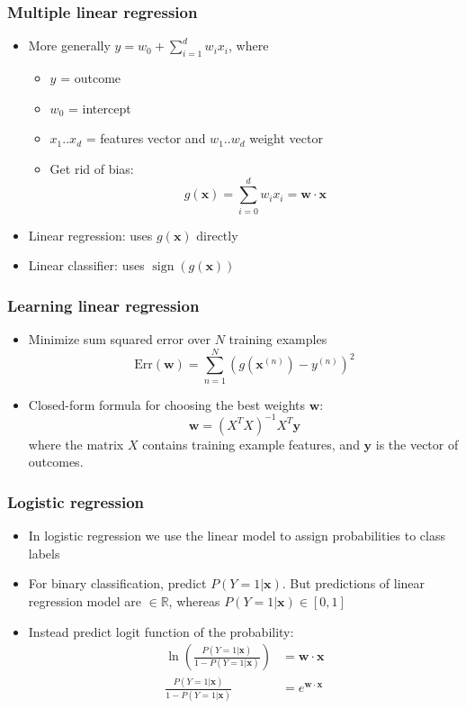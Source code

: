 \documentclass[14pt,mathserif,dvipsnames,usenames]{beamer}
\DeclareMathOperator*{\sign}{sign}
\newcommand{\x}{\mathbf{x}}
\newcommand{\w}{\mathbf{w}}
\newcommand{\voc}[1]{{\color{ForestGreen}#1}}
\begin{document}
\begin{frame}
\frametitle{Multiple linear regression}
\begin{itemize}
\item More generally $y = w_0 + \sum_{i=1}^{d} w_i x_i$, where
  \begin{itemize}
  \item $y$ = outcome
  \item $w_0$ = intercept
  \item $x_1..x_d$ = features vector and $w_1 .. w_d$ weight vector
    \item Get rid of bias:
      \[
      g(\x) = \sum_{i=0}^d w_i x_i = \w \cdot \x 
      \]
 \end{itemize}
 
  \item Linear regression: uses $g(\x)$ directly
  \item Linear classifier: uses $\sign(g(\x))$
\end{itemize}
\end{frame}

\begin{frame}
  \frametitle{Learning linear regression}
  \begin{itemize}
  \item Minimize \voc{sum squared error} over $N$ training examples 
    \[ \mathrm{Err}(\w) = \sum_{n=1}^{N}(g(\x^{(n)}) - y^{(n)})^2 \]
  \item Closed-form formula for choosing the best weights $\w$:
    \[ \w = (X^{T}X)^{-1} X^{T} \mathbf{y} \] where the matrix $X$
    contains training example features, and $\mathbf{y}$ is the vector
    of outcomes.
\end{itemize}
\end{frame}

\begin{frame}
\frametitle{Logistic regression}
\begin{itemize}
\item In logistic regression we use the linear model to assign
  probabilities to class labels
\item For binary classification, predict $P(Y=1|\x)$. But predictions
  of linear regression model are $\in \mathbb{R}$, whereas
  $P(Y=1|\x) \in [0,1]$
\item Instead predict logit function of the probability:
\begin{align*}
  \ln\left(\frac{ P(Y=1|\x) }{1-P(Y=1|\x)}\right) & = \w\cdot\x \\
  \frac{P(Y=1|\x)}{1-P(Y=1|\x)} & = e^{\w\cdot\x}
\end{align*}
\end{itemize}
\end{frame}
\end{document}

